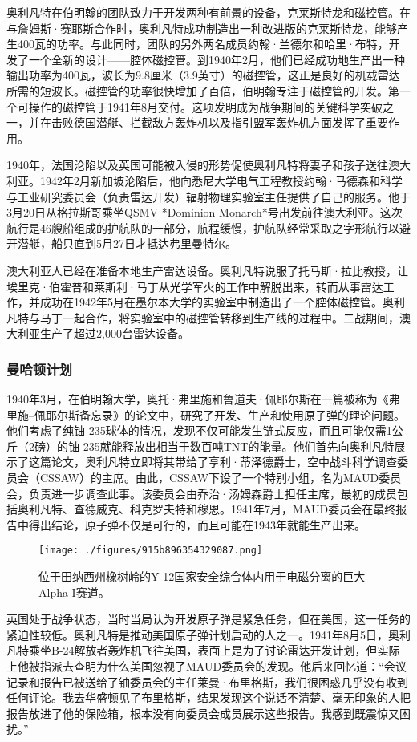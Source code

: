 奥利凡特在伯明翰的团队致力于开发两种有前景的设备，克莱斯特龙和磁控管。在与詹姆斯·赛耶斯合作时，奥利凡特成功制造出一种改进版的克莱斯特龙，能够产生400瓦的功率。与此同时，团队的另外两名成员约翰·兰德尔和哈里·布特，开发了一个全新的设计——腔体磁控管。到1940年2月，他们已经成功地生产出一种输出功率为400瓦，波长为9.8厘米（3.9英寸）的磁控管，这正是良好的机载雷达所需的短波长。磁控管的功率很快增加了百倍，伯明翰专注于磁控管的开发。第一个可操作的磁控管于1941年8月交付。这项发明成为战争期间的关键科学突破之一，并在击败德国潜艇、拦截敌方轰炸机以及指引盟军轰炸机方面发挥了重要作用。

1940年，法国沦陷以及英国可能被入侵的形势促使奥利凡特将妻子和孩子送往澳大利亚。1942年2月新加坡沦陷后，他向悉尼大学电气工程教授约翰·马德森和科学与工业研究委员会（负责雷达开发）辐射物理实验室主任提供了自己的服务。他于3月20日从格拉斯哥乘坐QSMV *Dominion Monarch*号出发前往澳大利亚。这次航行是46艘船组成的护航队的一部分，航程缓慢，护航队经常采取之字形航行以避开潜艇，船只直到5月27日才抵达弗里曼特尔。

澳大利亚人已经在准备本地生产雷达设备。奥利凡特说服了托马斯·拉比教授，让埃里克·伯霍普和莱斯利·马丁从光学军火的工作中解脱出来，转而从事雷达工作，并成功在1942年5月在墨尔本大学的实验室中制造出了一个腔体磁控管。奥利凡特与马丁一起合作，将实验室中的磁控管转移到生产线的过程中。二战期间，澳大利亚生产了超过2,000台雷达设备。
\subsubsection{曼哈顿计划}
1940年3月，在伯明翰大学，奥托·弗里施和鲁道夫·佩耶尔斯在一篇被称为《弗里施–佩耶尔斯备忘录》的论文中，研究了开发、生产和使用原子弹的理论问题。他们考虑了纯铀-235球体的情况，发现不仅可能发生链式反应，而且可能仅需1公斤（2磅）的铀-235就能释放出相当于数百吨TNT的能量。他们首先向奥利凡特展示了这篇论文，奥利凡特立即将其带给了亨利·蒂泽德爵士，空中战斗科学调查委员会（CSSAW）的主席。由此，CSSAW下设了一个特别小组，名为MAUD委员会，负责进一步调查此事。该委员会由乔治·汤姆森爵士担任主席，最初的成员包括奥利凡特、查德威克、科克罗夫特和穆恩。1941年7月，MAUD委员会在最终报告中得出结论，原子弹不仅是可行的，而且可能在1943年就能生产出来。
\begin{figure}[ht]
\centering
\texttt{[image: ./figures/915b896354329087.png]}
\caption{位于田纳西州橡树岭的Y-12国家安全综合体内用于电磁分离的巨大Alpha I赛道。} \label{fig_MKalft_6}
\end{figure}
英国处于战争状态，当时当局认为开发原子弹是紧急任务，但在美国，这一任务的紧迫性较低。奥利凡特是推动美国原子弹计划启动的人之一。1941年8月5日，奥利凡特乘坐B-24解放者轰炸机飞往美国，表面上是为了讨论雷达开发计划，但实际上他被指派去查明为什么美国忽视了MAUD委员会的发现。他后来回忆道：“会议记录和报告已被送给了铀委员会的主任莱曼·布里格斯，我们很困惑几乎没有收到任何评论。我去华盛顿见了布里格斯，结果发现这个说话不清楚、毫无印象的人把报告放进了他的保险箱，根本没有向委员会成员展示这些报告。我感到既震惊又困扰。”

